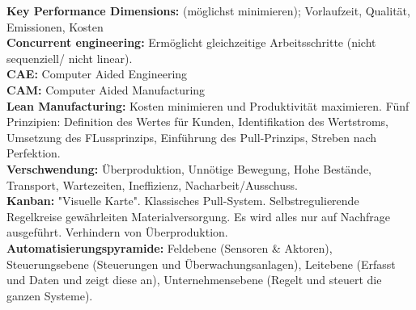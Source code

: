 \textbf{Key Performance Dimensions:} (möglichst minimieren); Vorlaufzeit, Qualität, Emissionen, Kosten \\
\textbf{Concurrent engineering:} Ermöglicht gleichzeitige Arbeitsschritte (nicht sequenziell/ nicht linear). \\
\textbf{CAE:} Computer Aided Engineering \\
\textbf{CAM:} Computer Aided Manufacturing \\
\textbf{Lean Manufacturing:} Kosten minimieren und Produktivität maximieren. Fünf Prinzipien: Definition des Wertes für Kunden, Identifikation des Wertstroms, Umsetzung des FLussprinzips, Einführung des Pull-Prinzips, Streben nach Perfektion. \\
\textbf{Verschwendung:} Überproduktion, Unnötige Bewegung, Hohe Bestände, Transport, Wartezeiten, Ineffizienz, Nacharbeit/Ausschuss.\\
\textbf{Kanban:} "Visuelle Karte". Klassisches Pull-System. Selbstregulierende Regelkreise gewährleiten Materialversorgung. Es wird alles nur auf Nachfrage ausgeführt. Verhindern von Überproduktion. \\
\textbf{Automatisierungspyramide:} Feldebene (Sensoren \& Aktoren), Steuerungsebene (Steuerungen und Überwachungsanlagen), Leitebene (Erfasst und Daten und zeigt diese an), Unternehmensebene (Regelt und steuert die ganzen Systeme).\\